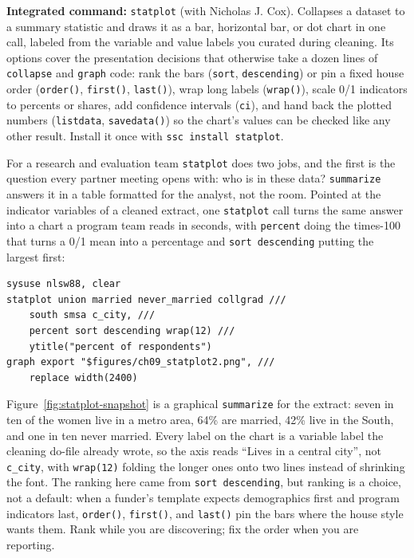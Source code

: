\documentclass[
    a4paper,
    fontsize=10pt,
    twoside=true,
    numbers=noenddot,
]{kaobook}
\begin{document}
\begin{kaobox}[frametitle=Package Integration: \texttt{statplot}]
\textbf{Integrated command:} \texttt{statplot} (with Nicholas J. Cox). Collapses a dataset to a summary statistic and draws it as a bar, horizontal bar, or dot chart in one call, labeled from the variable and value labels you curated during cleaning. Its options cover the presentation decisions that otherwise take a dozen lines of \texttt{collapse} and \texttt{graph} code: rank the bars (\texttt{sort}, \texttt{descending}) or pin a fixed house order (\texttt{order()}, \texttt{first()}, \texttt{last()}), wrap long labels (\texttt{wrap()}), scale 0/1 indicators to percents or shares, add confidence intervals (\texttt{ci}), and hand back the plotted numbers (\texttt{listdata}, \texttt{savedata()}) so the chart's values can be checked like any other result. Install it once with \texttt{ssc install statplot}.
\end{kaobox}

For a research and evaluation team \texttt{statplot} does two jobs, and the first is the question every partner meeting opens with: who is in these data? \texttt{summarize} answers it in a table formatted for the analyst, not the room. Pointed at the indicator variables of a cleaned extract, one \texttt{statplot} call turns the same answer into a chart a program team reads in seconds, with \texttt{percent} doing the times-100 that turns a 0/1 mean into a percentage and \texttt{sort descending} putting the largest first:
\par
{\footnotesize
\begin{verbatim}
sysuse nlsw88, clear
statplot union married never_married collgrad ///
    south smsa c_city, ///
    percent sort descending wrap(12) ///
    ytitle("percent of respondents")
graph export "$figures/ch09_statplot2.png", ///
    replace width(2400)
\end{verbatim}
}
Figure~\ref{fig:statplot-snapshot} is a graphical \texttt{summarize} for the extract: seven in ten of the women live in a metro area, 64\% are married, 42\% live in the South, and one in ten never married. Every label on the chart is a variable label the cleaning do-file already wrote, so the axis reads \enquote{Lives in a central city}, not \texttt{c\_city}, with \texttt{wrap(12)} folding the longer ones onto two lines instead of shrinking the font. The ranking here came from \texttt{sort descending}, but ranking is a choice, not a default: when a funder's template expects demographics first and program indicators last, \texttt{order()}, \texttt{first()}, and \texttt{last()} pin the bars where the house style wants them. Rank while you are discovering; fix the order when you are reporting.
\end{document}
